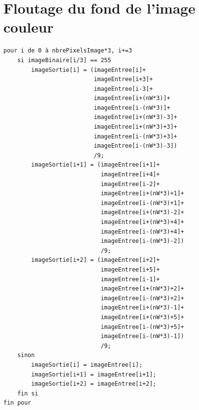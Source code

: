\documentclass[a4paper,11pt]{article}
\begin{document}
\section{Floutage du fond de l'image couleur}
\begin{verbatim}
pour i de 0 à nbrePixelsImage*3, i+=3
    si imageBinaire[i/3] == 255
        imageSortie[i] = (imageEntree[i]+
                          imageEntree[i+3]+
                          imageEntree[i-3]+
                          imageEntree[i+(nW*3)]+
                          imageEntree[i-(nW*3)]+
                          imageEntree[i+(nW*3)-3]+
                          imageEntree[i+(nW*3)+3]+
                          imageEntree[i-(nW*3)+3]+
                          imageEntree[i-(nW*3)-3])
                          /9;
        imageSortie[i+1] = (imageEntree[i+1]+
                            imageEntree[i+4]+
                            imageEntree[i-2]+
                            imageEntree[i+(nW*3)+1]+
                            imageEntree[i-(nW*3)+1]+
                            imageEntree[i+(nW*3)-2]+
                            imageEntree[i+(nW*3)+4]+
                            imageEntree[i-(nW*3)+4]+
                            imageEntree[i-(nW*3)-2])
                            /9;
        imageSortie[i+2] = (imageEntree[i+2]+
                            imageEntree[i+5]+
                            imageEntree[i-1]+
                            imageEntree[i+(nW*3)+2]+
                            imageEntree[i-(nW*3)+2]+
                            imageEntree[i+(nW*3)-1]+ 
                            imageEntree[i+(nW*3)+5]+ 
                            imageEntree[i-(nW*3)+5]+
                            imageEntree[i-(nW*3)-1])
                            /9;
    sinon
        imageSortie[i] = imageEntree[i];
        imageSortie[i+1] = imageEntree[i+1];
        imageSortie[i+2] = imageEntree[i+2];
    fin si
fin pour
\end{verbatim}
\end{document}
